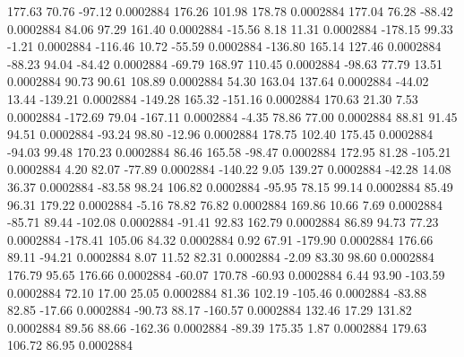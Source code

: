       177.63       70.76      -97.12     0.0002884
      176.26      101.98      178.78     0.0002884
      177.04       76.28      -88.42     0.0002884
       84.06       97.29      161.40     0.0002884
      -15.56        8.18       11.31     0.0002884
     -178.15       99.33       -1.21     0.0002884
     -116.46       10.72      -55.59     0.0002884
     -136.80      165.14      127.46     0.0002884
      -88.23       94.04      -84.42     0.0002884
      -69.79      168.97      110.45     0.0002884
      -98.63       77.79       13.51     0.0002884
       90.73       90.61      108.89     0.0002884
       54.30      163.04      137.64     0.0002884
      -44.02       13.44     -139.21     0.0002884
     -149.28      165.32     -151.16     0.0002884
      170.63       21.30        7.53     0.0002884
     -172.69       79.04     -167.11     0.0002884
       -4.35       78.86       77.00     0.0002884
       88.81       91.45       94.51     0.0002884
      -93.24       98.80      -12.96     0.0002884
      178.75      102.40      175.45     0.0002884
      -94.03       99.48      170.23     0.0002884
       86.46      165.58      -98.47     0.0002884
      172.95       81.28     -105.21     0.0002884
        4.20       82.07      -77.89     0.0002884
     -140.22        9.05      139.27     0.0002884
      -42.28       14.08       36.37     0.0002884
      -83.58       98.24      106.82     0.0002884
      -95.95       78.15       99.14     0.0002884
       85.49       96.31      179.22     0.0002884
       -5.16       78.82       76.82     0.0002884
      169.86       10.66        7.69     0.0002884
      -85.71       89.44     -102.08     0.0002884
      -91.41       92.83      162.79     0.0002884
       86.89       94.73       77.23     0.0002884
     -178.41      105.06       84.32     0.0002884
        0.92       67.91     -179.90     0.0002884
      176.66       89.11      -94.21     0.0002884
        8.07       11.52       82.31     0.0002884
       -2.09       83.30       98.60     0.0002884
      176.79       95.65      176.66     0.0002884
      -60.07      170.78      -60.93     0.0002884
        6.44       93.90     -103.59     0.0002884
       72.10       17.00       25.05     0.0002884
       81.36      102.19     -105.46     0.0002884
      -83.88       82.85      -17.66     0.0002884
      -90.73       88.17     -160.57     0.0002884
      132.46       17.29      131.82     0.0002884
       89.56       88.66     -162.36     0.0002884
      -89.39      175.35        1.87     0.0002884
      179.63      106.72       86.95     0.0002884
